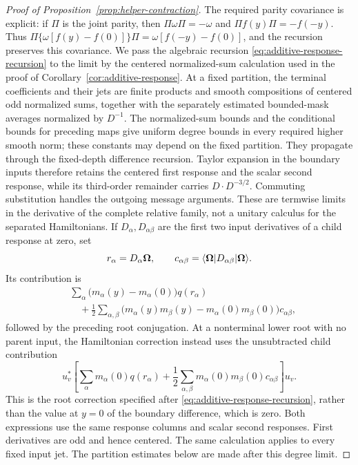 \begin{proof}[Proof of Proposition~\ref{prop:helper-contraction}]
The required parity covariance is explicit: if \(\Pi\) is the joint
parity, then \(\Pi\omega\Pi=-\omega\) and
\(\Pi f(y)\Pi=-f(-y)\).  Thus
\(\Pi\{\omega[f(y)-f(0)]\}\Pi=\omega[f(-y)-f(0)]\), and
the recursion preserves this covariance.  We pass the algebraic
recursion \eqref{eq:additive-response-recursion} to the limit by the
centered normalized-sum calculation used in the proof of
Corollary~\ref{cor:additive-response}.  At a fixed partition, the
terminal coefficients and their jets are finite products and smooth
compositions of centered odd normalized sums, together with the
separately estimated bounded-mask averages normalized by \(D^{-1}\).
The normalized-sum bounds and the conditional bounds for preceding
maps give uniform degree bounds in every required higher smooth norm;
these constants may depend on the fixed partition.  They propagate
through the fixed-depth difference recursion.  Taylor expansion in the
boundary inputs therefore retains the centered first response and the
scalar second response, while its third-order remainder carries
\(D\cdot D^{-3/2}\).  Commuting substitution handles the outgoing
message arguments.  These are termwise limits in the derivative of
the complete relative family, not a unitary calculus for the separated
Hamiltonians.  If \(D_\alpha,D_{\alpha\beta}\) are the first two input derivatives
of a child response at zero, set
\[
 r_\alpha=D_\alpha\boldsymbol\Omega,\qquad
 c_{\alpha\beta}=\langle \boldsymbol\Omega\rvert D_{\alpha\beta}\lvert \boldsymbol\Omega\rangle.
\]
Its contribution is
\begin{align}
 &\sum_\alpha\bigl(m_\alpha(y)-m_\alpha(0)\bigr)q(r_\alpha)
 \nonumber\\[-2pt]
 &\quad+\frac12\sum_{\alpha,\beta}
 \bigl(m_\alpha(y)m_\beta(y)
        -m_\alpha(0)m_\beta(0)\bigr)c_{\alpha\beta},
 \label{eq:limiting-additive-response}
\end{align}
followed by the preceding root conjugation.  At a nonterminal lower
root with no parent input, the Hamiltonian correction instead uses
the unsubtracted child contribution
\[
 u_v^*\left[
 \sum_\alpha m_\alpha(0)q(r_\alpha)
 +\frac12\sum_{\alpha,\beta}
       m_\alpha(0)m_\beta(0)c_{\alpha\beta}
 \right]u_v.
\]
This is the root correction specified after
\eqref{eq:additive-response-recursion}, rather than the value at
\(y=0\) of the boundary difference, which is zero.  Both expressions
use the same response columns and scalar second responses.
First derivatives are odd and hence centered.  The same calculation
applies to every fixed input jet.  The partition estimates below are
made after this degree limit.


\end{proof}
